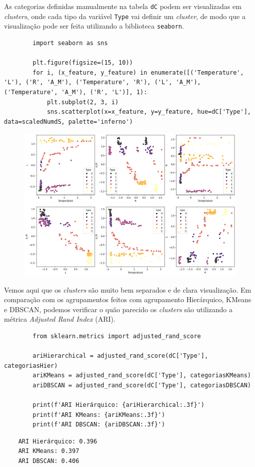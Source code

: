 

As categorias definidas manualmente na tabela \verb|dC| podem ser visualizadas em \textit{clusters}, onde cada tipo da variável \verb|Type| vai definir um \textit{cluster}, de modo que a visualização pode ser feita utilizando a biblioteca \verb|seaborn|.
\begin{longlisting}
    \begin{verbatim}
        import seaborn as sns

        plt.figure(figsize=(15, 10))
        for i, (x_feature, y_feature) in enumerate([('Temperature', 'L'), ('R', 'A_M'), ('Temperature', 'R'), ('L', 'A_M'), ('Temperature', 'A_M'), ('R', 'L')], 1):
            plt.subplot(2, 3, i)
            sns.scatterplot(x=x_feature, y=y_feature, hue=dC['Type'], data=scaledNumdS, palette='inferno')
    \end{verbatim}
\end{longlisting}
\begin{figure}[H]
    \centering
    \includegraphics[width=1\linewidth]{figures/Manual.png}
\end{figure}

Vemos aqui que os \textit{clusters} são muito bem separados e de clara visualização. Em comparação com os agrupamentos feitos com agrupamento Hierárquico, KMeans e DBSCAN, podemos verificar o quão parecido os \textit{clusters} são utilizando a métrica \textit{Adjusted Rand Index} (ARI).
\begin{longlisting}
    \begin{verbatim}
        from sklearn.metrics import adjusted_rand_score

        ariHierarchical = adjusted_rand_score(dC['Type'], categoriasHier)
        ariKMeans = adjusted_rand_score(dC['Type'], categoriasKMeans)
        ariDBSCAN = adjusted_rand_score(dC['Type'], categoriasDBSCAN)
        
        print(f'ARI Hierárquico: {ariHierarchical:.3f}')
        print(f'ARI KMeans: {ariKMeans:.3f}')
        print(f'ARI DBSCAN: {ariDBSCAN:.3f}')
    \end{verbatim}
\end{longlisting}
\begin{verbatim}
    ARI Hierárquico: 0.396
    ARI KMeans: 0.397
    ARI DBSCAN: 0.406
\end{verbatim}

